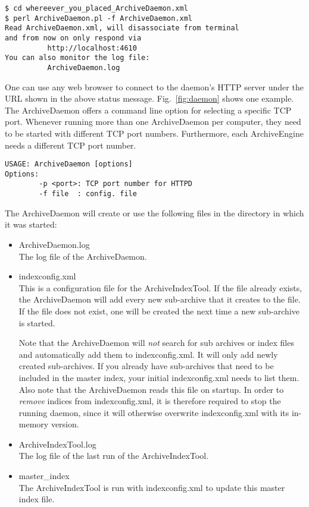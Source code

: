 \begin{lstlisting}[keywordstyle=\sffamily]
$ cd whereever_you_placed_ArchiveDaemon.xml
$ perl ArchiveDaemon.pl -f ArchiveDaemon.xml
Read ArchiveDaemon.xml, will disassociate from terminal
and from now on only respond via
          http://localhost:4610
You can also monitor the log file:
          ArchiveDaemon.log
\end{lstlisting}

\noindent One can use any web browser to connect to the daemon's HTTP server
under the URL shown in the above status message. Fig.~\ref{fig:daemon}
shows one example. The ArchiveDaemon offers a command line option for
selecting a specific TCP port.
Whenever running more than one ArchiveDaemon per computer, they
need to be started with different TCP port numbers. Furthermore, each
ArchiveEngine needs a different TCP port number.
\begin{lstlisting}[keywordstyle=\sffamily]
USAGE: ArchiveDaemon [options] 
Options:
        -p <port>: TCP port number for HTTPD
        -f file  : config. file
\end{lstlisting}

\noindent The ArchiveDaemon will create or use the following files in the
directory in which it was started:
\begin{itemize}
\item ArchiveDaemon.log\\
  The log file of the ArchiveDaemon.
\item indexconfig.xml\\
  This is a configuration file for the ArchiveIndexTool.  If the file
  already exists, the ArchiveDaemon will add every new sub-archive
  that it creates to the file. If the file does not exist, one will be
  created the next time a new sub-archive is started.

  Note that the ArchiveDaemon will \emph{not} search for sub archives
  or index files and automatically add them to indexconfig.xml. It
  will only add newly created sub-archives. If you already have
  sub-archives that need to be included in the master index, your
  initial indexconfig.xml needs to list them.
  Also note that the ArchiveDaemon reads this file on startup. In
  order to \emph{remove} indices from indexconfig.xml, it is therefore
  required to stop the running daemon, since it will otherwise
  overwrite indexconfig.xml with its in-memory version.
\item ArchiveIndexTool.log\\
  The log file of the last run of the ArchiveIndexTool.
\item master\_index\\
  The ArchiveIndexTool is run with indexconfig.xml to update
  this master index file.
\end{itemize}

